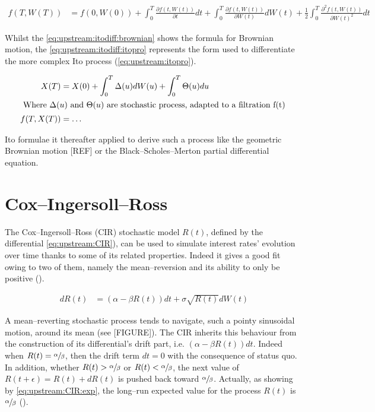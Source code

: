 \documentclass[12pt]{report}
\begin{document}
\begin{align}
  f(T, W(T)) &= f(0, W(0))
               + \int_0^T \frac{\partial f(t, W(t))}{\partial t} dt
               + \int_0^T \frac{\partial f(t, W(t))}{\partial W(t)} dW(t)
               + \frac{1}{2} \int_0^T \frac{\partial^2 f(t, W(t))}{\partial W(t)^2} dt \label{eq:upstream:itodiff:brownian}
\end{align}

Whilst the \cref{eq:upstream:itodiff:brownian} shows the formula for Brownian motion, the \cref{eq:upstream:itodiff:itopro} represents the form used to differentiate the more complex Ito process (\ref{eq:upstream:itopro}).

\begin{align}
  X(T) &= X(0)
         + \int_0^T \Delta(u) dW(u)
         + \int_0^T \Theta(u) du \label{eq:upstream:itopro} \\
  \intertext{
  Where $\Delta(u)$ and $\Theta(u)$ are stochastic process, adapted to a filtration f(t)
  }
  f(T, X(T)) &= \ldots
\end{align}

Ito formulae it thereafter applied to derive such a process like the geometric Brownian motion [REF] or the Black--Scholes--Merton partial differential equation. 



\section{Cox--Ingersoll--Ross}
\label{sec:CoxIngersollRoss}

The Cox--Ingersoll--Ross (CIR) stochastic model $R(t)$, defined by the differential \cref{eq:upstream:CIR}), can be used to simulate interest rates' evolution over time thanks to some of its related properties. Indeed it gives a good fit owing to two of them, namely the mean--reversion and its ability to only be positive (\citet{shreve}).

\begin{align}
dR(t) &= (\alpha - \beta R(t)) dt + \sigma \sqrt{R(t)} dW(t)
\label{eq:upstream:CIR}
\end{align}

A mean--reverting stochastic process tends to navigate, such a pointy sinusoidal motion, around its mean (see [FIGURE]).
The CIR inherits this behaviour from the construction of its differential's drift part, i.e. $(\alpha - \beta R(t))dt$.
Indeed when $R(t) = \sfrac{\alpha}{\beta}$, then the drift term $dt = 0$ with the consequence of status quo.
In addition, whether $R(t) > \sfrac{\alpha}{\beta}$ or $R(t) < \sfrac{\alpha}{\beta}$, the next value of $R(t + \epsilon) = R(t) + dR(t)$ is pushed back toward $\sfrac{\alpha}{\beta}$.
Actually, as showing by \cref{eq:upstream:CIR:exp}, the long--run expected value for the process $R(t)$ is $\sfrac{\alpha}{\beta}$ (\citet{shreve}).
\end{document}

